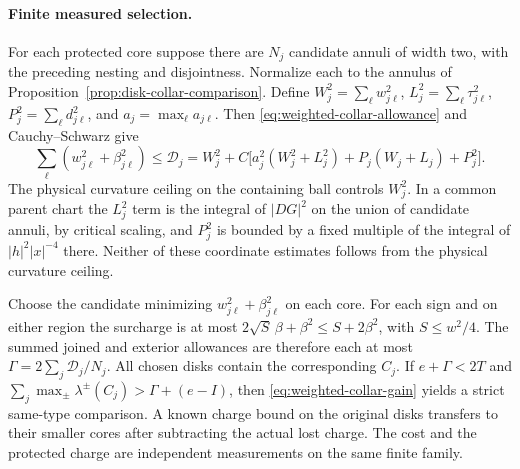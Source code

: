 \paragraph{Finite measured selection.}
For each protected core suppose there are \(N_j\) candidate
annuli of width two, with the preceding nesting and disjointness.
Normalize each to the annulus of
Proposition~\ref{prop:disk-collar-comparison}. Define
\(W_j^2=\sum_\ell w_{j\ell}^2\),
\(L_j^2=\sum_\ell\tau_{j\ell}^2\),
\(P_j^2=\sum_\ell d_{j\ell}^2\), and \(a_j=\max_\ell a_{j\ell}\).
Then \eqref{eq:weighted-collar-allowance} and Cauchy--Schwarz give
\[
 \sum_\ell(w_{j\ell}^2+\beta_{j\ell}^2)
 \le \mathcal D_j
 =W_j^2+C\bigl[a_j^2(W_j^2+L_j^2)
                +P_j(W_j+L_j)+P_j^2\bigr].
\]
The physical curvature ceiling on the containing ball controls
\(W_j^2\). In a common parent chart the \(L_j^2\) term is the
integral of \(|DG|^2\) on the union of candidate annuli, by
critical scaling, and \(P_j^2\) is bounded by a fixed multiple
of the integral of \(|h|^2|x|^{-4}\) there. Neither of these
coordinate estimates follows from the physical curvature ceiling.

Choose the candidate minimizing \(w_{j\ell}^2+\beta_{j\ell}^2\)
on each core. For each sign and on either region the surcharge
is at most \(2\sqrt S\,\beta+\beta^2\le S+2\beta^2\), with
\(S\le w^2/4\). The summed joined and exterior allowances
are therefore each at most \(\Gamma=2\sum_j\mathcal D_j/N_j\).
All chosen disks contain the corresponding \(C_j\).
If \(e+\Gamma<2T\) and
\(\sum_j\max_\pm\lambda^\pm(C_j)>\Gamma+(e-I)\),
then \eqref{eq:weighted-collar-gain} yields a strict same-type
comparison. A known charge bound on the original disks transfers
to their smaller cores after subtracting the actual lost charge.
The cost and the protected charge are independent measurements on
the same finite family.

